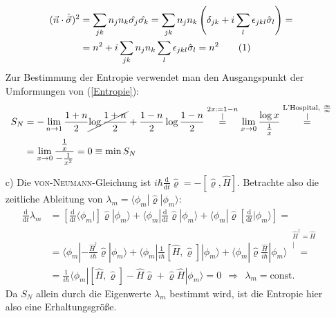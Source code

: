 \documentclass[a4paper,12pt]{article}
\newcommand\numberthis{\addtocounter{equation}{1}\tag{\theequation}}
\newcommand{\kom}{}
\newcommand{\braket}{}
\newcommand{\kla}{}
\newcommand{\klam}{}
\newcommand{\tecxt}{}
\newcommand{\Bra}{}
\newcommand{\Ket}{}
\begin{document}
\begin{enumerate}
\begin{align*}
(\vec{n}\cdot\hat{\vec{\sigma}})^2&=\sum_{jk}n_jn_k\hat{\sigma_j}\hat{\sigma_k}=\sum_{jk}n_jn_k\kla\left( {\delta_{jk}+i\sum_l\epsilon_{jkl}\hat{\sigma}_l} \right)=\\
&=n^2+i\sum_{jk}n_jn_k\sum_l\epsilon_{jkl}\hat\sigma_l=n^2\numberthis\label{n sigma qudrat gleichung}
\end{align*}
Zur Bestimmung der Entropie verwendet man den Ausgangspunkt der Umformungen von (\ref{Entropie}):
\begin{align*}
S_N&=-\lim_{n\rightarrow 1}\frac{1+n}{2}\cancel{\log\frac{1+n}{2}}+\frac{1-n}{2}\log\frac{1-n}{2}\kom\overset{\substack{{2x:=1-n} \\ |}}{=}\lim_{x\rightarrow 0}\frac{\log x}{\frac{1}{x}}\kom\overset{\substack{{\tecxt\text{L'Hospital, }\frac{\infty}{\infty}} \\ |}}{=}\\
&=\lim_{x\rightarrow 0}\frac{\frac{1}{x}}{-\frac{1}{x^2}}=0\equiv\min S_N
\end{align*}
\item[c)] Die \textsc{von-Neumann}-Gleichung ist $i\hbar\frac{\tecxt\text{d}}{\tecxt\text{d}t}\hat{\varrho}=-[\hat{\varrho},\hat{H}]$. Betrachte also die zeitliche Ableitung von $\lambda_m=\braket\langle {\phi_m} | {\hat{\varrho}} | {\phi_m}\rangle$:
\begin{align*}
\frac{\tecxt\text{d}}{\tecxt\text{d}t}\lambda_m&=\klam\left[ {\frac{\tecxt\text{d}}{\tecxt\text{d}t}\Bra\langle {\phi_m} |} \right]\hat{\varrho}\Ket | {\phi_m} \rangle+\braket\langle {\phi_m} | {\frac{\tecxt\text{d}}{\tecxt\text{d}t}\hat{\varrho}} | {\phi_m}\rangle+\Bra\langle {\phi_m} |\hat{\varrho}\klam\left[ {\frac{\tecxt\text{d}}{\tecxt\text{d}t}\Ket | {\phi_m} \rangle} \right]=\\
&=\braket\langle {\phi_m} | {-\frac{\hat{H}^\dagger}{i\hbar}\hat{\varrho}} | {\phi_m}\rangle+\braket\langle {\phi_m} | {\frac{1}{i\hbar}[\hat{H},\hat{\varrho}]} | {\phi_m}\rangle+\braket\langle {\phi_m} | {\hat{\varrho}\frac{\hat{H}}{i\hbar}} | {\phi_m}\rangle\kom\overset{\substack{{\hat{H}^\dagger=\hat{H}} \\ |}}{=}\\
&=\frac{1}{i\hbar}\braket\langle {\phi_m} | {[\hat{H},\hat{\varrho}]-\hat{H}\hat{\varrho}+\hat{\varrho}\hat{H}} | {\phi_m}\rangle=0\ \ \Rightarrow\ \ \lambda_m=\tecxt\text{const.}
\end{align*}
Da $S_N$ allein durch die Eigenwerte $\lambda_m$ bestimmt wird, ist die Entropie hier also eine Erhaltungsgröße.
\end{enumerate}
\end{document}
